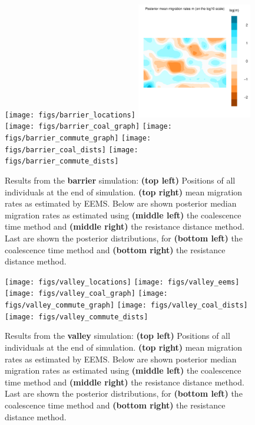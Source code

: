 \documentclass{article}
\begin{document}
\begin{figure}
\centering
    \texttt{[image: figs/barrier\_locations]}
    \includegraphics[width=0.45\textwidth]{figs/barrier_eems}
    \texttt{[image: figs/barrier\_coal\_graph]}
    \texttt{[image: figs/barrier\_commute\_graph]}
    \texttt{[image: figs/barrier\_coal\_dists]}
    \texttt{[image: figs/barrier\_commute\_dists]}
    \caption{
        Results from the \textbf{barrier} simulation:
        \textbf{(top left)} Positions of all individuals at the end of simulation.
        \textbf{(top right)} mean migration rates as estimated by EEMS.
        Below are shown
        posterior median migration rates 
            as estimated using
            \textbf{(middle left)} the coalescence time method and
            \textbf{(middle right)} the resistance distance method.
        Last are shown the posterior distributions, for
            \textbf{(bottom left)} the coalescence time method and
            \textbf{(bottom right)} the resistance distance method.
        \label{sfig:barrier_results}
    }
\end{figure}

\begin{figure}
\centering
    \texttt{[image: figs/valley\_locations]}
    \texttt{[image: figs/valley\_eems]}
    \texttt{[image: figs/valley\_coal\_graph]}
    \texttt{[image: figs/valley\_commute\_graph]}
    \texttt{[image: figs/valley\_coal\_dists]}
    \texttt{[image: figs/valley\_commute\_dists]}
    \caption{
        Results from the \textbf{valley} simulation:
        \textbf{(top left)} Positions of all individuals at the end of simulation.
        \textbf{(top right)} mean migration rates as estimated by EEMS.
        Below are shown
        posterior median migration rates 
            as estimated using 
            \textbf{(middle left)} the coalescence time method and
            \textbf{(middle right)} the resistance distance method.
        Last are shown the posterior distributions, for
            \textbf{(bottom left)} the coalescence time method and
            \textbf{(bottom right)} the resistance distance method.
        \label{sfig:valley_results}
    }
\end{figure}
\end{document}
